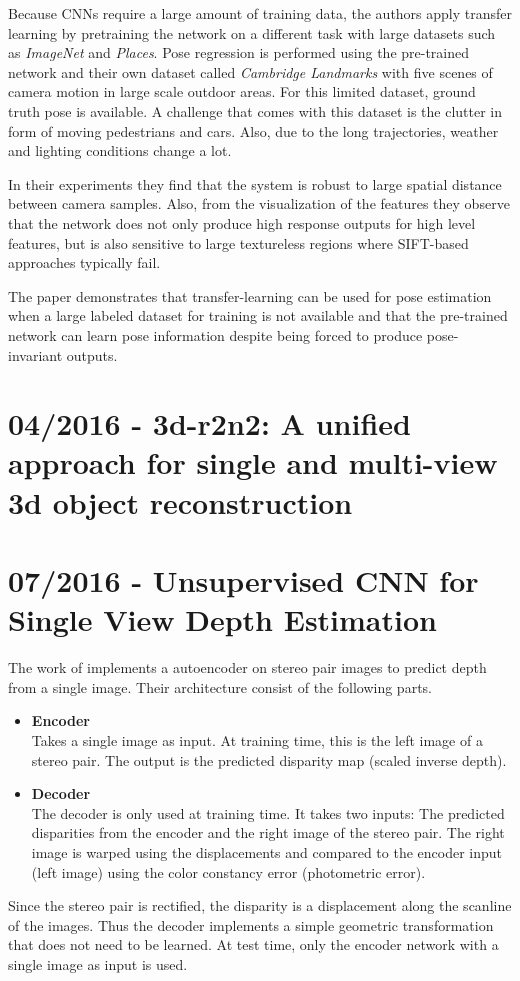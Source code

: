 		Because CNNs require a large amount of training data, the authors apply transfer learning by pretraining the network on a different task with large datasets such as \emph{ImageNet} and \emph{Places}.
		Pose regression is performed using the pre-trained network and their own dataset called \emph{Cambridge Landmarks} with five scenes of camera motion in large scale outdoor areas.
		For this limited dataset, ground truth pose is available.
		A challenge that comes with this dataset is the clutter in form of moving pedestrians and cars.
		Also, due to the long trajectories, weather and lighting conditions change a lot.
		
		In their experiments they find that the system is robust to large spatial distance between camera samples.
		Also, from the visualization of the features they observe that the network does not only produce high response outputs for high level features, but is also sensitive to large textureless regions where {SIFT}-based approaches typically fail.
		
		The paper demonstrates that transfer-learning can be used for pose estimation when a large labeled dataset for training is not available and that the pre-trained network can learn pose information despite being forced to produce pose-invariant outputs.
		
		
	\section{04/2016 - 3d-r2n2: A unified approach for single and multi-view 3d object reconstruction}
		
		\cite{choy20163d}
		
	\section{07/2016 - Unsupervised CNN for Single View Depth Estimation}
		
		The work of \cite{garg2016} implements a autoencoder on stereo pair images to predict depth from a single image.
		Their architecture consist of the following parts.
		\begin{itemize}
			\item \textbf{Encoder}
				\\
				Takes a single image as input. 
				At training time, this is the left image of a stereo pair.
				The output is the predicted disparity map (scaled inverse depth).
			\item \textbf{Decoder}
				\\
				The decoder is only used at training time.
				It takes two inputs: The predicted disparities from the encoder and the right image of the stereo pair.
				The right image is warped using the displacements and compared to the encoder input (left image) using the color constancy error (photometric error).
		\end{itemize}
		Since the stereo pair is rectified, the disparity is a displacement along the scanline of the images.
		Thus the decoder implements a simple geometric transformation that does not need to be learned.
		At test time, only the encoder network with a single image as input is used.
		

